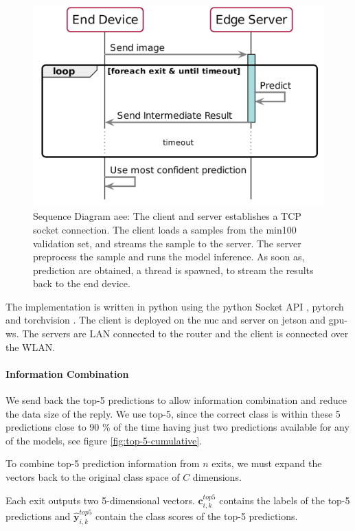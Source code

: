 \begin{figure}
	\captionsetup[subfigure]{justification=centering}
	\centering
	\includegraphics[width=.7\linewidth]{figures/models/sequence_diagram}
	\caption[Sequence Diagram \acrshort{aee}]{Sequence Diagram \acrshort{aee}: The client and server establishes a TCP socket connection. The client loads a samples from the \gls{min100} validation set, and streams the sample to the server. The server preprocess the sample and runs the model inference. As soon as, prediction are obtained, a thread is spawned, to stream the results back to the end device. }
	\label{fig:sequence-diagram}
\end{figure}

The implementation is written in \gls{python} using the \gls{python} Socket API \cite{noauthor_socket_nodate}, \gls{pytorch} \cite{paszke_automatic_2017} and \gls{torchvision} \cite{marcel_torchvision_2010}. The client is deployed on the \gls{nuc} and server on \gls{jetson} and \gls{gpu-ws}. The servers are LAN connected to the router and the client is connected over the WLAN.

\paragraph{Information Combination}

We send back the top-5 predictions to allow information combination and reduce the data size of the reply. We use top-5, since the correct class is within these 5 predictions close to 90 \% of the time having just two predictions available for any of the models, see figure \ref{fig:top-5-cumulative}.

To combine top-5 prediction information from $ n $ exits, we must expand the vectors back to the original class space of $ C $ dimensions.

Each exit outputs two 5-dimensional vectors. $\mathbf{c}_{i,k}^{top5}$ contains the labels of the top-5 predictions and $ \mathbf{\hat{y}}_{i,k}^{top5}$ contain the class scores of the top-5 predictions. 

